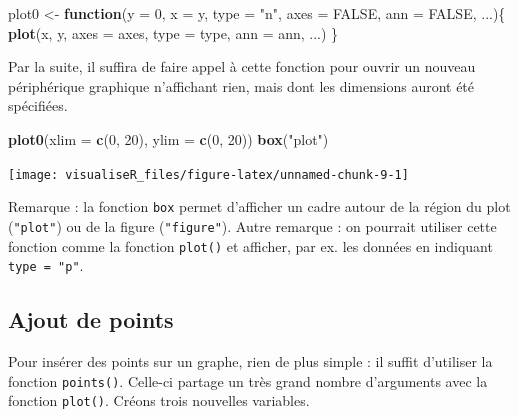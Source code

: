 \documentclass[]{article}
\newenvironment{Shaded}{\begin{snugshade}}{\end{snugshade}}
\newcommand{\ControlFlowTok}[1]{\textcolor[rgb]{0.13,0.29,0.53}{\textbf{#1}}}
\newcommand{\DataTypeTok}[1]{\textcolor[rgb]{0.13,0.29,0.53}{#1}}
\newcommand{\DecValTok}[1]{\textcolor[rgb]{0.00,0.00,0.81}{#1}}
\newcommand{\KeywordTok}[1]{\textcolor[rgb]{0.13,0.29,0.53}{\textbf{#1}}}
\newcommand{\NormalTok}[1]{#1}
\newcommand{\OtherTok}[1]{\textcolor[rgb]{0.56,0.35,0.01}{#1}}
\newcommand{\StringTok}[1]{\textcolor[rgb]{0.31,0.60,0.02}{#1}}
\begin{document}
\begin{Shaded}
\begin{Highlighting}[]
\NormalTok{plot0 <-}\StringTok{ }\ControlFlowTok{function}\NormalTok{(}\DataTypeTok{y =} \DecValTok{0}\NormalTok{, }\DataTypeTok{x =}\NormalTok{ y, }\DataTypeTok{type =} \StringTok{"n"}\NormalTok{, }\DataTypeTok{axes =} \OtherTok{FALSE}\NormalTok{, }\DataTypeTok{ann =} \OtherTok{FALSE}\NormalTok{, ...)\{}
\KeywordTok{plot}\NormalTok{(x, y, }\DataTypeTok{axes =}\NormalTok{ axes, }\DataTypeTok{type =}\NormalTok{ type, }\DataTypeTok{ann =}\NormalTok{ ann, ...)}
\NormalTok{\}}
\end{Highlighting}
\end{Shaded}

Par la suite, il suffira de faire appel à cette fonction pour ouvrir un nouveau périphérique graphique n'affichant rien, mais dont les dimensions auront été spécifiées.

\begin{Shaded}
\begin{Highlighting}[]
\KeywordTok{plot0}\NormalTok{(}\DataTypeTok{xlim =} \KeywordTok{c}\NormalTok{(}\DecValTok{0}\NormalTok{, }\DecValTok{20}\NormalTok{), }\DataTypeTok{ylim =} \KeywordTok{c}\NormalTok{(}\DecValTok{0}\NormalTok{, }\DecValTok{20}\NormalTok{))}
\KeywordTok{box}\NormalTok{(}\StringTok{"plot"}\NormalTok{)}
\end{Highlighting}
\end{Shaded}

\begin{center}\texttt{[image: visualiseR\_files/figure-latex/unnamed-chunk-9-1]} \end{center}

Remarque : la fonction \texttt{box} permet d'afficher un cadre autour de la région du plot (\texttt{"plot"}) ou de la figure (\texttt{"figure"}). Autre remarque : on pourrait utiliser cette fonction comme la fonction \texttt{plot()} et afficher, par ex. les données en indiquant \texttt{type\ =\ "p"}.

\hypertarget{ajout-de-points}{%
\subsection{Ajout de points}\label{ajout-de-points}}

Pour insérer des points sur un graphe, rien de plus simple : il suffit d'utiliser la fonction \texttt{points()}. Celle-ci partage un très grand nombre d'arguments avec la fonction \texttt{plot()}.
Créons trois nouvelles variables.
\end{document}
